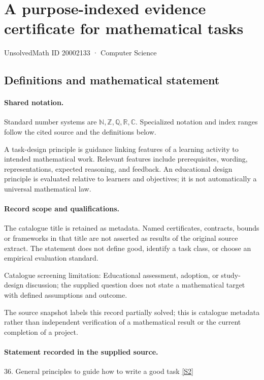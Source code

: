 \documentclass[11pt]{article}
\newcommand{\sref}[2]{\hyperlink{source:#1:#2}{[S#2]}}
\begin{document}
\setcounter{section}{20002132}
\section{A purpose-indexed evidence certificate for mathematical tasks}\label{20002133}
{\small\sffamily UnsolvedMath ID 20002133 · Computer Science}
\subsection{Definitions and mathematical statement}

\paragraph{Shared notation.}Standard number systems are $\mathbb N,\mathbb Z,\mathbb Q,\mathbb R,\mathbb C$. Specialized notation and index ranges follow the cited source and the definitions below.


A task-design principle is guidance linking features of a learning activity to intended mathematical work. Relevant features include prerequisites, wording, representations, expected reasoning, and feedback. An educational design principle is evaluated relative to learners and objectives; it is not automatically a universal mathematical law.
\paragraph{Record scope and qualifications.}
The catalogue title is retained as metadata. Named certificates, contracts, bounds or frameworks in that title are not asserted as results of the original source extract.
The statement does not define good, identify a task class, or choose an empirical evaluation standard.

Catalogue screening limitation: Educational assessment, adoption, or study-design discussion; the supplied question does not state a mathematical target with defined assumptions and outcome.

The source snapshot labels this record partially solved; this is catalogue metadata rather than independent verification of a mathematical result or the current completion of a project.
\paragraph{Statement recorded in the supplied source.}
36. General principles to guide how to write a good task \sref{20002133}{2}
\end{document}
